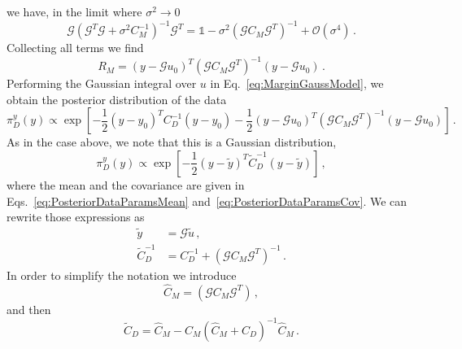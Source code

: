 we have, in the limit where $\sigma^2 \to 0$
\begin{equation}
    \label{eq:QuadraticYTerm}
    \mathcal{G} \left(\mathcal{G}^T \mathcal{G} + \sigma^2 C_M^{-1}\right)^{-1} 
    \mathcal{G}^T = 
    \mathds{1} - \sigma^2 \left(\mathcal{G} C_M \mathcal{G}^T\right)^{-1} + 
    \mathcal{O}(\sigma^4)\, .
\end{equation}
Collecting all terms we find
\begin{equation}
    \label{eq:RMAfterLimit}
    R_M = \left(y - \mathcal{G} u_0\right)^T 
        \left(\mathcal{G} C_M \mathcal{G}^T\right)^{-1}
        \left(y- \mathcal{G} u_0\right)\, .
\end{equation}
Performing the Gaussian integral over $u$ in Eq.~\ref{eq:MarginGaussModel}, we
obtain the posterior distribution of the data
\begin{equation}
    \label{eq:PosteriorDataDistr}
    \pi_D^y(y) \propto 
    \exp\left[-\frac12 \left(y-y_0\right)^T C_D^{-1} \left(y - y_0\right)
    -\frac12 \left(y - \mathcal{G} u_0\right)^T 
    \left(\mathcal{G} C_M \mathcal{G}^T\right)^{-1}
    \left(y - \mathcal{G} u_0\right)
    \right]\, .
\end{equation}
As in the case above, we note that this is a Gaussian distribution,
\begin{equation}
    \label{eq:PosteriorDataDistrGauss}
    \pi_D^{y}(y) \propto
    \exp \left[
        -\frac12 \left(y - \tilde{y}\right)^T
        \tilde{C}_D^{-1} 
        \left(y - \tilde{y}\right)
    \right]\, ,
\end{equation}
where the mean and the covariance are given in
Eqs.~\ref{eq:PosteriorDataParamsMean} and~\ref{eq:PosteriorDataParamsCov}. We
can rewrite those expressions as
\begin{align}
    \tilde{y} &= \mathcal{G} \tilde{u} \, , \\
    \tilde{C}_D^{-1} &=
        C_D^{-1} + \left(\mathcal{G} C_M \mathcal{G}^T\right)^{-1}\, .
\end{align}
In order to simplify the notation we introduce
\begin{equation}
    \hat{C}_M = \left(\mathcal{G} C_M \mathcal{G}^T\right)\, ,
\end{equation}
and then
\begin{equation}
    \tilde{C}_D = \hat{C}_M
    - \hat{C}_M \left(\hat{C}_M + C_D \right)^{-1} 
    \hat{C}_M\, .
\end{equation}
